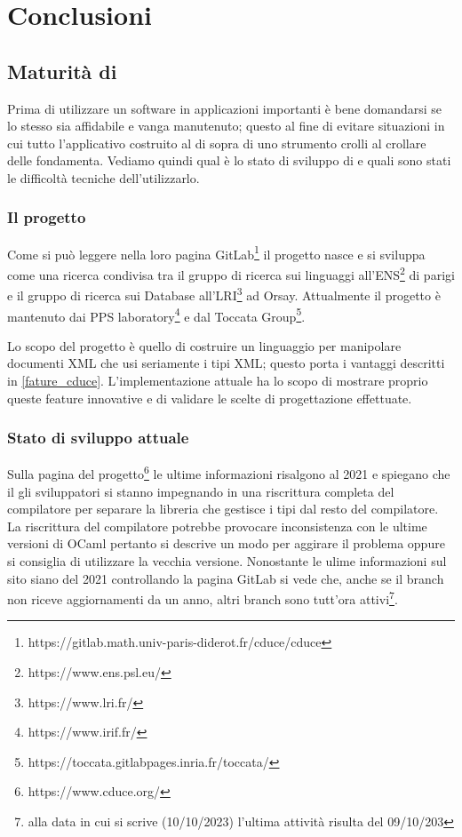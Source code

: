 \chapter{Conclusioni}
\section{Maturità di \cduce}
Prima di utilizzare un software in applicazioni importanti è bene domandarsi se lo stesso sia affidabile e vanga manutenuto; questo al fine di evitare situazioni in cui tutto l'applicativo costruito al di sopra di uno strumento crolli al crollare delle fondamenta. Vediamo quindi qual è lo stato di sviluppo di \cduce e quali sono stati le difficoltà tecniche dell'utilizzarlo.
\subsection{Il progetto \cduce}
Come si può leggere nella loro pagina GitLab\footnote{https://gitlab.math.univ-paris-diderot.fr/cduce/cduce} il progetto nasce e si sviluppa come una ricerca condivisa tra il gruppo di ricerca sui linguaggi all'ENS\footnote{https://www.ens.psl.eu/} di parigi e il gruppo di ricerca sui Database all'LRI\footnote{https://www.lri.fr/} ad Orsay. Attualmente il progetto è mantenuto dai PPS laboratory\footnote{https://www.irif.fr/} e dal  Toccata Group\footnote{https://toccata.gitlabpages.inria.fr/toccata/}.

Lo scopo del progetto è quello di costruire un linguaggio per manipolare documenti XML che usi seriamente i tipi XML; questo porta i vantaggi descritti in \ref{fature_cduce}. L'implementazione attuale ha lo scopo di mostrare proprio queste feature innovative e di validare le scelte di progettazione effettuate.
\subsection{Stato di sviluppo attuale}
Sulla pagina del progetto\footnote{https://www.cduce.org/} le ultime informazioni risalgono al 2021 e spiegano che il gli sviluppatori si stanno impegnando in una riscrittura completa del compilatore per separare la libreria che gestisce i tipi dal resto del compilatore. La riscrittura del compilatore potrebbe provocare inconsistenza con le ultime versioni di OCaml pertanto si descrive un modo per aggirare il problema oppure si consiglia di utilizzare la vecchia versione. Nonostante le ulime informazioni sul sito siano del 2021 controllando la pagina GitLab si vede che, anche se il branch  non riceve aggiornamenti da un anno, altri branch sono tutt'ora attivi\footnote{alla data in cui si scrive (10/10/2023) l'ultima attività risulta del 09/10/203}.
